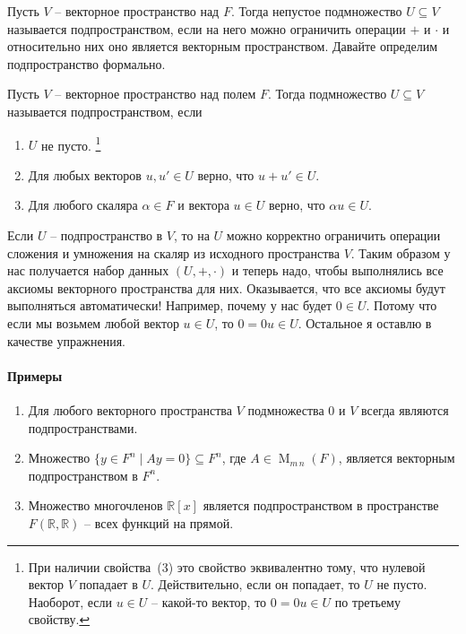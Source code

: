 Пусть $V$ -- векторное пространство над $F$.
Тогда непустое подмножество $U\subseteq V$ называется подпространством, если на него можно ограничить операции $+$ и $\cdot$ и относительно них оно является векторным пространством.
Давайте определим подпространство формально.
\begin{definition}
Пусть $V$ -- векторное пространство над полем $F$.
Тогда подмножество $U\subseteq V$ называется подпространством, если
\begin{enumerate}
\item $U$ не пусто.%
\footnote{При наличии свойства~(3) это свойство эквивалентно тому, что нулевой вектор $V$ попадает в $U$.
Действительно, если он попадает, то $U$ не пусто.
Наоборот, если $u\in U$ -- какой-то вектор, то $0 = 0 u\in U$ по третьему свойству.}

\item Для любых векторов $u,u'\in U$ верно, что $u+u'\in U$.

\item Для любого скаляра $\alpha\in F$ и вектора $u\in U$ верно, что $\alpha u \in U$.
\end{enumerate}
\end{definition}
Если $U$ -- подпространство в $V$, то на $U$ можно корректно ограничить операции сложения и умножения на скаляр из исходного пространства $V$.
Таким образом у нас получается набор данных $(U, +, \cdot)$ и теперь надо, чтобы выполнялись все аксиомы векторного пространства для них.
Оказывается, что все аксиомы будут выполняться автоматически!
Например, почему у нас будет $0\in U$.
Потому что если мы возьмем любой вектор $u\in U$, то $0 = 0 u \in U$.
Остальное я оставлю в качестве упражнения.

\paragraph{Примеры}

\begin{enumerate}
\item Для любого векторного пространства $V$ подмножества $0$ и $V$ всегда являются подпространствами.

\item Множество $\{y\in F^n \mid Ay = 0\}\subseteq F^n$, где $A\in\operatorname{M}_{m\,n}(F)$, является векторным подпространством в $F^n$.

\item Множество многочленов $\mathbb R[x]$ является подпространством в пространстве $F(\mathbb R, \mathbb R)$ -- всех функций на прямой.
\end{enumerate}

